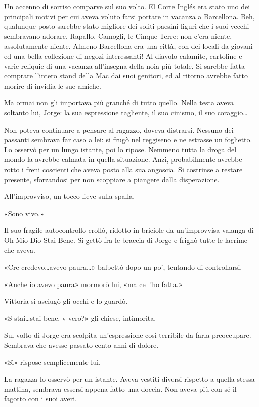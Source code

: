 Un accenno di sorriso comparve sul suo volto. El Corte Inglés era stato uno dei principali motivi per cui aveva voluto farsi portare in vacanza a Barcellona. Beh, qualunque posto sarebbe stato migliore dei soliti paesini liguri che i suoi vecchi sembravano adorare. Rapallo, Camogli, le Cinque Terre: non c'era niente, assolutamente niente. Almeno Barcellona era una città, con dei locali da giovani ed una bella collezione di negozi interessanti! Al diavolo calamite, cartoline e varie reliquie di una vacanza all'insegna della noia più totale. Si sarebbe fatta comprare l'intero stand della Mac dai suoi genitori, ed al ritorno avrebbe fatto morire di invidia le sue amiche.

Ma ormai non gli importava più granché di tutto quello. Nella testa aveva soltanto lui, Jorge: la sua espressione tagliente, il suo cinismo, il suo coraggio\ldots

Non poteva continuare a pensare al ragazzo, doveva distrarsi. Nessuno dei passanti sembrava far caso a lei: si frugò nel reggiseno e ne estrasse un foglietto. Lo osservò per un lungo istante, poi lo ripose. Nemmeno tutta la droga del mondo la avrebbe calmata in quella situazione. Anzi, probabilmente avrebbe rotto i freni coscienti che aveva posto alla sua angoscia. Si costrinse a restare presente, sforzandosi per non scoppiare a piangere dalla disperazione.

All'improvviso, un tocco lieve sulla spalla.

«Sono vivo.»

Il suo fragile autocontrollo crollò, ridotto in briciole da un'improvvisa valanga di Oh-Mio-Dio-Stai-Bene. Si gettò fra le braccia di Jorge e frignò tutte le lacrime che aveva.

«Cre-credevo\ldots avevo paura\ldots» balbettò dopo un po', tentando di controllarsi.

«Anche io avevo paura» mormorò lui, «ma ce l'ho fatta.»

Vittoria si asciugò gli occhi e lo guardò.

«S-stai\ldots stai bene, v-vero?» gli chiese, intimorita.

Sul volto di Jorge era scolpita un'espressione così terribile da farla preoccupare. Sembrava che avesse passato cento anni di dolore.

«Sì» rispose semplicemente lui.

La ragazza lo osservò per un istante. Aveva vestiti diversi rispetto a quella stessa mattina, sembrava essersi appena fatto una doccia. Non aveva più con sé il fagotto con i suoi averi.

